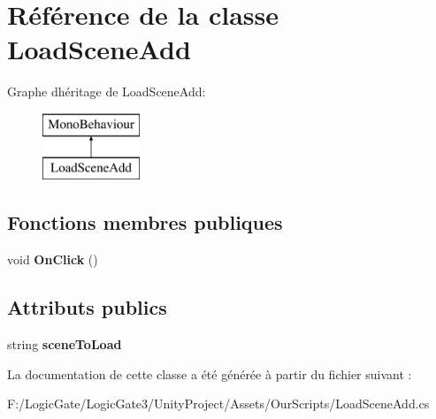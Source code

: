 \hypertarget{class_load_scene_add}{}\section{Référence de la classe Load\+Scene\+Add}
\label{class_load_scene_add}
Graphe d\textquotesingle{}héritage de Load\+Scene\+Add\+:\begin{figure}[H]
\begin{center}
\leavevmode
\includegraphics[height=2.000000cm]{class_load_scene_add}
\end{center}
\end{figure}
\subsection*{Fonctions membres publiques}
\begin{DoxyCompactItemize}
\item 
\mbox{\label{class_load_scene_add_ab3265a9d67e26dbd627c339785eb8749}} 
void {\bfseries On\+Click} ()
\end{DoxyCompactItemize}
\subsection*{Attributs publics}
\begin{DoxyCompactItemize}
\item 
\mbox{\label{class_load_scene_add_ae41b80a61d0923d997a6343e35355727}} 
string {\bfseries scene\+To\+Load}
\end{DoxyCompactItemize}


La documentation de cette classe a été générée à partir du fichier suivant \+:\begin{DoxyCompactItemize}
\item 
F\+:/\+Logic\+Gate/\+Logic\+Gate3/\+Unity\+Project/\+Assets/\+Our\+Scripts/Load\+Scene\+Add.\+cs\end{DoxyCompactItemize}

